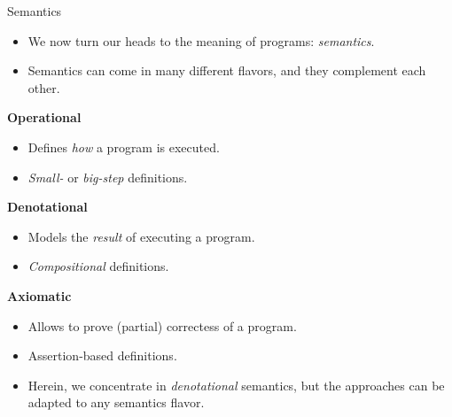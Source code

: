 \documentclass[aspectratio=169]{beamer}
\begin{document}
%
\begin{frame}{Semantics}
  \begin{itemize}
  \item We now turn our heads to the meaning of programs: \emph{semantics}.
  \item Semantics can come in many different flavors, and they complement each other.
  \end{itemize}
  \pause\medskip
  {\small\begin{minipage}[t]{.32\textwidth}
    \begin{center}
      \textbf{Operational\\\cite{plotkin-sopsem}}
    \end{center}
    \vspace{-.8em}
    \begin{itemize}
    \item Defines \emph{how} a program is executed.
    \item \emph{Small-} or \emph{big-step} definitions.
    \end{itemize}
  \end{minipage}
  \hfill
  \begin{minipage}[t]{.32\textwidth}
    \begin{center}
      \textbf{Denotational\\\cite{scott71}}
    \end{center}
    \vspace{-.8em}
    \begin{itemize}
    \item Models the \emph{result} of executing a program.
    \item \emph{Compositional} definitions.
    \end{itemize}
  \end{minipage}
  \hfill
  \begin{minipage}[t]{.32\textwidth}
    \begin{center}
      \textbf{Axiomatic\\\cite{hoare69}}
    \end{center}
    \vspace{-.8em}
    \begin{itemize}
    \item Allows to prove (partial) correctess of a program.
    \item Assertion-based definitions.
    \end{itemize}
  \end{minipage}}
  \pause\bigskip
  \begin{itemize}
  \item Herein, we concentrate in \emph{denotational} semantics, but
    the approaches can be adapted to any semantics flavor.
  \end{itemize}
\end{frame}
\end{document}
